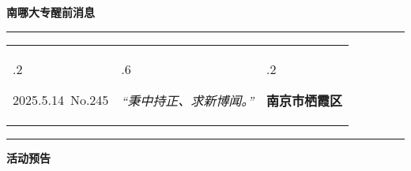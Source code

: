 \documentclass[letterpaper, 12pt]{article}
\begin{document}
\begin{center}
    \Huge\textbf{南哪大专醒前消息}
\end{center}
\vspace{4mm}
\hrule
\renewcommand\tabularxcolumn[1]{m{#1}}
\begin{tabularx}{\textwidth}{>{\hsize.2\hsize}X>{\hsize.6\hsize}X>{\hsize.2\hsize}X}
    \begin{flushleft}
        2025.5.14\, No.245
    \end{flushleft}
    &
    \begin{center}
        \textit{“秉中持正、求新博闻。”}
    \end{center}
    &
    \begin{flushright}
        \textbf{南京市栖霞区}
    \end{flushright}
\end{tabularx}
\vspace{-3.5mm}
\hrule
\vspace{4mm}
\centerline{\huge\textbf{活动预告}}
\end{document}

